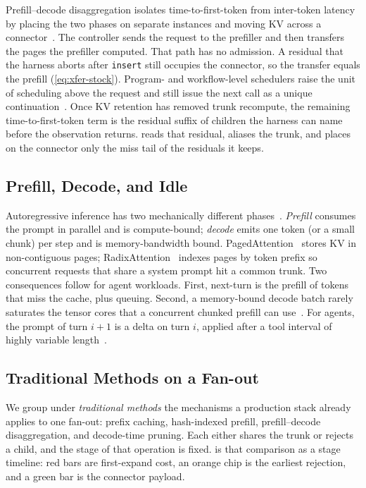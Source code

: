 Prefill--decode disaggregation isolates time-to-first-token from inter-token latency by placing the two phases on separate instances and moving KV across a connector~\cite{distserve,splitwise}.
The controller sends the request to the prefiller and then transfers the pages the prefiller computed.
That path has no admission.
A residual that the harness aborts after \texttt{insert} still occupies the connector, so the transfer equals the prefill (\eqref{eq:xfer-stock}).
Program- and workflow-level schedulers raise the unit of scheduling above the request and still issue the next call as a unique continuation~\cite{autellix,thunderagent,continuum,mori}.
Once KV retention has removed trunk recompute, the remaining time-to-first-token term is the residual suffix of children the harness can name before the observation returns.
\sys reads that residual, aliases the trunk, and places on the connector only the miss tail of the residuals it keeps.

\subsection{Prefill, Decode, and Idle}
Autoregressive inference has two mechanically different phases~\cite{orca,distserve,splitwise}.
\emph{Prefill} consumes the prompt in parallel and is compute-bound; \emph{decode} emits one token (or a small chunk) per step and is memory-bandwidth bound.
PagedAttention~\cite{vllm} stores KV in non-contiguous pages; RadixAttention~\cite{sglang} indexes pages by token prefix so concurrent requests that share a system prompt hit a common trunk.
Two consequences follow for agent workloads.
First, next-turn \ttft{} is the prefill of tokens that miss the cache, plus queuing.
Second, a memory-bound decode batch rarely saturates the tensor cores that a concurrent chunked prefill can use~\cite{sarathi}.
For agents, the prompt of turn $i{+}1$ is a delta on turn $i$, applied after a tool interval of highly variable length~\cite{continuum,mori}.

\subsection{Traditional Methods on a Fan-out}
\label{sec:traditional-app}
We group under \emph{traditional methods} the mechanisms a production stack already applies to one fan-out: prefix caching, hash-indexed prefill, prefill--decode disaggregation, and decode-time pruning.
Each either shares the trunk or rejects a child, and the stage of that operation is fixed.
 is that comparison as a stage timeline: red bars are first-expand cost, an orange chip is the earliest rejection, and a green bar is the connector payload.

